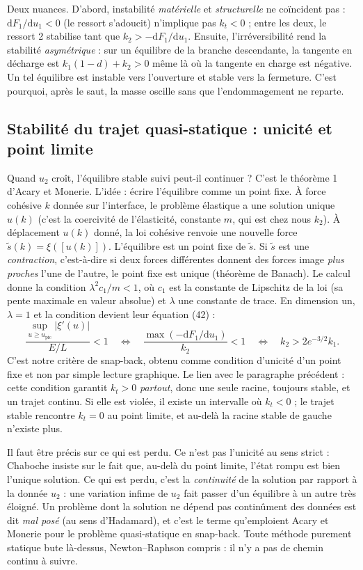 \documentclass[11pt,a4paper]{article}
\newcommand{\dd}{\mathrm{d}}
\begin{document}
Deux nuances. D'abord, instabilité \emph{matérielle} et \emph{structurelle} ne coïncident
pas : $\dd F_1/\dd u_1 < 0$ (le ressort s'adoucit) n'implique pas $k_t < 0$ ; entre les deux, le
ressort 2 stabilise tant que $k_2 > -\dd F_1/\dd u_1$. Ensuite, l'irréversibilité rend la
stabilité \emph{asymétrique} : sur un équilibre de la branche descendante, la tangente en
décharge est $k_1(1-d)+k_2 > 0$ même là où la tangente en charge est négative. Un tel
équilibre est instable vers l'ouverture et stable vers la fermeture. C'est pourquoi, après le
saut, la masse oscille sans que l'endommagement ne reparte.

\subsection{Stabilité du trajet quasi-statique : unicité et point limite}
Quand $u_2$ croît, l'équilibre stable suivi peut-il continuer ? C'est le théorème 1 d'Acary et
Monerie. L'idée : écrire l'équilibre comme un point fixe. À force cohésive $k$ donnée sur
l'interface, le problème élastique a une solution unique $u(k)$ (c'est la coercivité de
l'élasticité, constante $m$, qui est chez nous $k_2$). À déplacement $u(k)$ donné, la loi
cohésive renvoie une nouvelle force $\tilde s(k) = \xi([u(k)])$. L'équilibre est un point fixe
de $\tilde s$. Si $\tilde s$ est une \emph{contraction}, c'est-à-dire si deux forces différentes
donnent des forces image \emph{plus proches} l'une de l'autre, le point fixe est unique
(théorème de Banach). Le calcul donne la condition $\lambda^2c_1/m < 1$, où $c_1$ est la
constante de Lipschitz de la loi (sa pente maximale en valeur absolue) et $\lambda$ une constante
de trace. En dimension un, $\lambda = 1$ et la condition devient leur équation (42) :
\begin{equation}
  \frac{\sup_{u\ge u_{\text{pic}}}|\xi'(u)|}{E/L} < 1
  \quad\Longleftrightarrow\quad
  \frac{\max(-\dd F_1/\dd u_1)}{k_2} < 1
  \quad\Longleftrightarrow\quad
  k_2 > 2e^{-3/2}k_1 .
\end{equation}
C'est notre critère de snap-back, obtenu comme condition d'unicité d'un point fixe et non par
simple lecture graphique. Le lien avec le paragraphe précédent : cette condition garantit
$k_t > 0$ \emph{partout}, donc une seule racine, toujours stable, et un trajet continu. Si elle
est violée, il existe un intervalle où $k_t < 0$ ; le trajet stable rencontre $k_t = 0$ au point
limite, et au-delà la racine stable de gauche n'existe plus.

Il faut être précis sur ce qui est perdu. Ce n'est pas l'unicité au sens strict : Chaboche
insiste sur le fait que, au-delà du point limite, l'état rompu est bien l'unique solution. Ce
qui est perdu, c'est la \emph{continuité} de la solution par rapport à la donnée $u_2$ : une
variation infime de $u_2$ fait passer d'un équilibre à un autre très éloigné. Un problème dont
la solution ne dépend pas continûment des données est dit \emph{mal posé} (au sens
d'Hadamard), et c'est le terme qu'emploient Acary et Monerie pour le problème quasi-statique
en snap-back. Toute méthode purement statique bute là-dessus, Newton--Raphson compris : il
n'y a pas de chemin continu à suivre.
\end{document}
